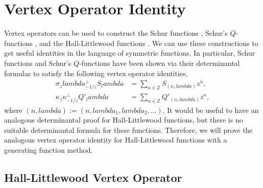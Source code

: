 \documentclass[12pt]{amsart}%
\def\lambda{lambda}%
\newtheorem{proposition}[theorem]{Proposition}
\theoremstyle{remark}
\theoremstyle{definition}
\newcommand{\Z}{\mathbb{Z}}
\begin{document}
    \section{Vertex Operator Identity}

    Vertex operators can be used to construct the Schur functions \cite[p.~317]{kac:1990}, Schur's $Q$-functions \cite{jing:1991a}, and the Hall-Littlewood functions \cite{jing:1991b}. We can use these constructions to get useful identities in the language of symmetric functions. In particular, Schur functions and Schur's $Q$-functions have been shown via their determinantal formulas \cite{carre-thibon:1992,graf-jing:2024a} to satisfy the following vertex operator identities,
    \begin{align*}
        \sigma_z\lambda_{-1/z}^\perp S_\lambda&=\sum_{n\in\Z}S_{(n,\lambda)}z^n,\\
        \kappa_z\kappa_{-1/z}^\perp Q'_\lambda&=\sum_{n\in\Z}Q'_{(n,\lambda)}z^n,
    \end{align*}
    where $(n,\lambda):=(n,\lambda_1,\lambda_2,\ldots)$. It would be useful to have an analogous determinantal proof for Hall-Littlewood functions, but there is no suitable determinantal formula for these functions. Therefore, we will prove the analogous vertex operator identity for Hall-Littlewood functions with a generating function method.

    \subsection{Hall-Littlewood Vertex Operator}
    


        
\end{document}
